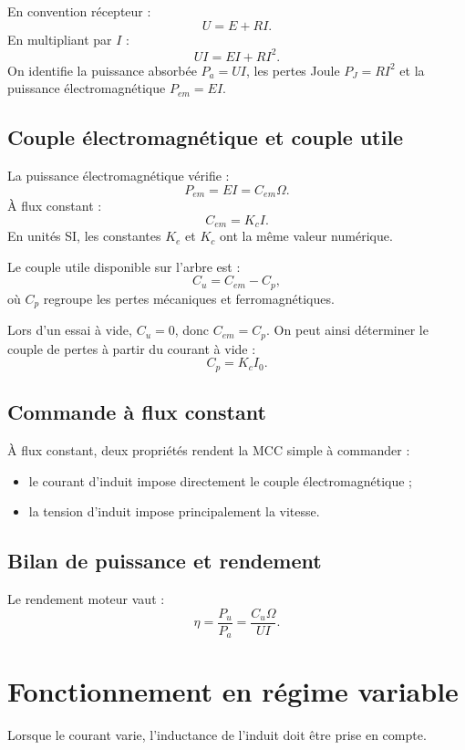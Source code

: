 \TLSchemaInduitMCCPermanent

En convention récepteur :
\[
U=E+RI.
\]
En multipliant par $I$ :
\[
UI=EI+RI^2.
\]
On identifie la puissance absorbée $P_a=UI$, les pertes Joule $P_J=RI^2$ et la puissance
électromagnétique $P_{em}=EI$.

\subsection{Couple électromagnétique et couple utile}

La puissance électromagnétique vérifie :
\[
P_{em}=EI=C_{em}\Omega.
\]
À flux constant :
\[
C_{em}=K_c I.
\]
En unités SI, les constantes $K_e$ et $K_c$ ont la même valeur numérique.

Le couple utile disponible sur l'arbre est :
\[
C_u=C_{em}-C_p,
\]
où $C_p$ regroupe les pertes mécaniques et ferromagnétiques.

Lors d'un essai à vide, $C_u=0$, donc $C_{em}=C_p$. On peut ainsi déterminer le couple de
pertes à partir du courant à vide :
\[
C_p=K_c I_0.
\]

\subsection{Commande à flux constant}

À flux constant, deux propriétés rendent la MCC simple à commander :
\begin{itemize}
  \item le courant d'induit impose directement le couple électromagnétique ;
  \item la tension d'induit impose principalement la vitesse.
\end{itemize}

\TLQuadrantsMCC

\subsection{Bilan de puissance et rendement}

\TLBilanPuissancesMCC

Le rendement moteur vaut :
\[
\eta=\frac{P_u}{P_a}=\frac{C_u\Omega}{UI}.
\]

\section{Fonctionnement en régime variable}\label{sec:mcc-variable}

Lorsque le courant varie, l'inductance de l'induit doit être prise en compte.

